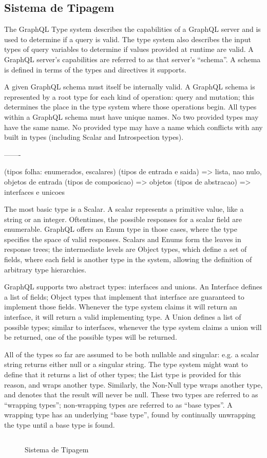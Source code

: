 \subsection[Sistema de Tipagem]{Sistema de Tipagem}

The GraphQL Type system describes the capabilities of a GraphQL server and is used to determine if a query is valid. The type system also describes the input types of query variables to determine if values provided at runtime are valid. A GraphQL server’s capabilities are referred to as that server’s “schema”. A schema is defined in terms of the types and directives it supports.

A given GraphQL schema must itself be internally valid. A GraphQL schema is represented by a root type for each kind of operation: query and mutation; this determines the place in the type system where those operations begin. All types within a GraphQL schema must have unique names. No two provided types may have the same name. No provided type may have a name which conflicts with any built in types (including Scalar and Introspection types).

-------

(tipos folha: enumerados, escalares)
(tipos de entrada e saida) => lista, nao nulo, objetos de entrada
(tipos de composicao) => objetos
(tipos de abstracao) => interfaces e unicoes

The most basic type is a Scalar. A scalar represents a primitive value, like a string or an integer. Oftentimes, the possible responses for a scalar field are enumerable. GraphQL offers an Enum type in those cases, where the type specifies the space of valid responses. Scalars and Enums form the leaves in response trees; the intermediate levels are Object types, which define a set of fields, where each field is another type in the system, allowing the definition of arbitrary type hierarchies.

GraphQL supports two abstract types: interfaces and unions. An Interface defines a list of fields; Object types that implement that interface are guaranteed to implement those fields. Whenever the type system claims it will return an interface, it will return a valid implementing type. A Union defines a list of possible types; similar to interfaces, whenever the type system claims a union will be returned, one of the possible types will be returned.

All of the types so far are assumed to be both nullable and singular: e.g. a scalar string returns either null or a singular string. The type system might want to define that it returns a list of other types; the List type is provided for this reason, and wraps another type. Similarly, the Non-Null type wraps another type, and denotes that the result will never be null. These two types are referred to as “wrapping types”; non‐wrapping types are referred to as “base types”. A wrapping type has an underlying “base type”, found by continually unwrapping the type until a base type is found.

\begin{figure}[H]
  \centering
  \inputminted[frame=single,framesep=10pt]{javascript}{anexos/graphql-type-system.txt}
  \caption{Sistema de Tipagem}
\end{figure}
